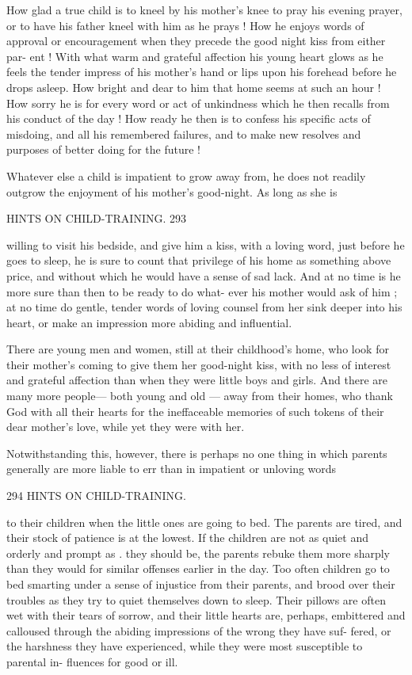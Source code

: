 \documentclass[
]{book}
\begin{document}
How glad a true child is to kneel by his mother's knee to pray his evening prayer, or to have his father kneel with him as he prays ! How he enjoys words of approval or encouragement when they precede the good night kiss from either par- ent ! With what warm and grateful affection his young heart glows as he feels the tender impress of his mother's hand or lips upon his forehead before he drops asleep. How bright and dear to him that home seems at such an hour ! How sorry he is for every word or act of unkindness which he then recalls from his conduct of the day ! How ready he then is to confess his specific acts of misdoing, and all his remembered failures, and to make new resolves and purposes of better doing for the future !

Whatever else a child is impatient to grow away from, he does not readily outgrow the enjoyment of his mother's good-night. As long as she is

HINTS ON CHILD-TRAINING. 293

willing to visit his bedside, and give him a kiss, with a loving word, just before he goes to sleep, he is sure to count that privilege of his home as something above price, and without which he would have a sense of sad lack. And at no time is he more sure than then to be ready to do what- ever his mother would ask of him ; at no time do gentle, tender words of loving counsel from her sink deeper into his heart, or make an impression more abiding and influential.

There are young men and women, still at their childhood's home, who look for their mother's coming to give them her good-night kiss, with no less of interest and grateful affection than when they were little boys and girls. And there are many more people--- both young and old --- away from their homes, who thank God with all their hearts for the ineffaceable memories of such tokens of their dear mother's love, while yet they were with her.

Notwithstanding this, however, there is perhaps no one thing in which parents generally are more liable to err than in impatient or unloving words

294 HINTS ON CHILD-TRAINING.

to their children when the little ones are going to bed. The parents are tired, and their stock of patience is at the lowest. If the children are not as quiet and orderly and prompt as . they should be, the parents rebuke them more sharply than they would for similar offenses earlier in the day. Too often children go to bed smarting under a sense of injustice from their parents, and brood over their troubles as they try to quiet themselves down to sleep. Their pillows are often wet with their tears of sorrow, and their little hearts are, perhaps, embittered and calloused through the abiding impressions of the wrong they have suf- fered, or the harshness they have experienced, while they were most susceptible to parental in- fluences for good or ill.
\end{document}
